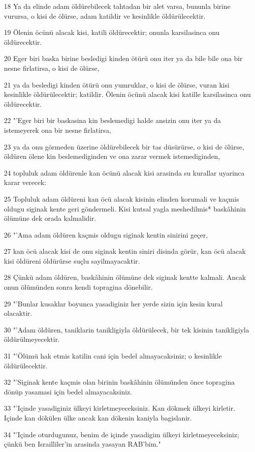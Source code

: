 \par 18 Ya da elinde adam öldürebilecek tahtadan bir alet varsa, bununla birine vurursa, o kisi de ölürse, adam katildir ve kesinlikle öldürülecektir.
\par 19 Ölenin öcünü alacak kisi, katili öldürecektir; onunla karsilasinca onu öldürecektir.
\par 20 Eger biri baska birine besledigi kinden ötürü onu iter ya da bile bile ona bir nesne firlatirsa, o kisi de ölürse,
\par 21 ya da besledigi kinden ötürü onu yumruklar, o kisi de ölürse, vuran kisi kesinlikle öldürülecektir; katildir. Ölenin öcünü alacak kisi katille karsilasinca onu öldürecektir.
\par 22 "'Eger biri bir baskasina kin beslemedigi halde ansizin onu iter ya da istemeyerek ona bir nesne firlatirsa,
\par 23 ya da onu görmeden üzerine öldürebilecek bir tas düsürürse, o kisi de ölürse, öldüren ölene kin beslemediginden ve ona zarar vermek istemediginden,
\par 24 topluluk adam öldürenle kan öcünü alacak kisi arasinda su kurallar uyarinca karar verecek:
\par 25 Topluluk adam öldüreni kan öcü alacak kisinin elinden korumali ve kaçmis oldugu siginak kente geri göndermeli. Kisi kutsal yagla meshedilmis* baskâhinin ölümüne dek orada kalmalidir.
\par 26 "'Ama adam öldüren kaçmis oldugu siginak kentin sinirini geçer,
\par 27 kan öcü alacak kisi de onu siginak kentin siniri disinda görür, kan öcü alacak kisi öldüreni öldürürse suçlu sayilmayacaktir.
\par 28 Çünkü adam öldüren, baskâhinin ölümüne dek siginak kentte kalmali. Ancak onun ölümünden sonra kendi topragina dönebilir.
\par 29 "'Bunlar kusaklar boyunca yasadiginiz her yerde sizin için kesin kural olacaktir.
\par 30 "'Adam öldüren, taniklarin tanikligiyla öldürülecek, bir tek kisinin tanikligiyla öldürülmeyecektir.
\par 31 "'Ölümü hak etmis katilin cani için bedel almayacaksiniz; o kesinlikle öldürülecektir.
\par 32 "'Siginak kente kaçmis olan birinin baskâhinin ölümünden önce topragina dönüp yasamasi için bedel almayacaksiniz.
\par 33 "'Içinde yasadiginiz ülkeyi kirletmeyeceksiniz. Kan dökmek ülkeyi kirletir. Içinde kan dökülen ülke ancak kan dökenin kaniyla bagislanir.
\par 34 "'Içinde oturdugunuz, benim de içinde yasadigim ülkeyi kirletmeyeceksiniz; çünkü ben Israilliler'in arasinda yasayan RAB'bim."

